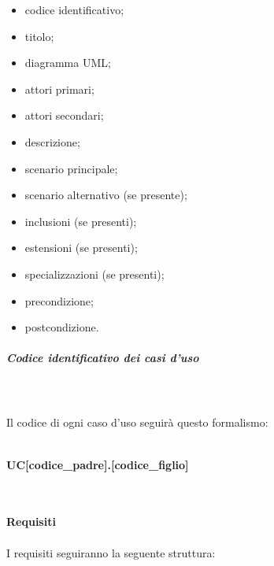 				\begin{itemize}
					\item codice identificativo;
					\item titolo;
					\item diagramma UML\glo;
					\item attori primari;
					\item attori secondari;
					\item descrizione;
					\item scenario principale;
					\item scenario alternativo (se presente);
					\item inclusioni (se presenti);
					\item estensioni (se presenti);
					\item specializzazioni (se presenti);
					\item precondizione;
					\item postcondizione. 
				\end{itemize}
				\subparagraph*{Codice identificativo dei casi d'uso} \mbox{} \\ \mbox{} \\
			Il codice di ogni caso d'uso seguirà questo formalismo: \\ \\
			\centerline{\textbf{UC[codice\_padre].[codice\_figlio]}} \\ \\
			\textbf{Requisiti} \\ \\
			I requisiti seguiranno la seguente struttura:

